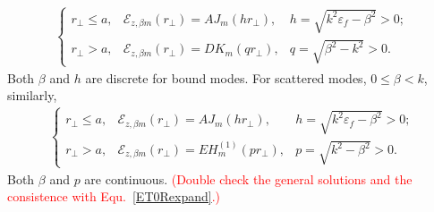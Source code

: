 \documentclass[]{report}
\begin{document}
\begin{align}
\left\{
 \begin{array}{lcll}
	r\!_\perp \leq a, & \mathcal{E}_{z,\beta m}(r\!_\perp )\!=\! AJ_m(h r\!_\perp), & h \!=\! 
	\sqrt{k^2\varepsilon_f-\beta^2}\! >\! 0;\\
	r\!_\perp > a, & \mathcal{E}_{z,\beta m}(r\!_\perp )\!=\!DK_m(q r\!_\perp), & q\!=\! 
	\sqrt{\beta^2-k^2}>0.
 \end{array}\right.
\end{align}
Both $ \beta $ and $ h $ are discrete for bound modes. 
For scattered modes, $ 0\leq \beta< k $, similarly, 
\begin{align}
\left\{
 \begin{array}{lcll}
	r\!_\perp \leq a, & \mathcal{E}_{z,\beta m}(r\!_\perp )\!=\! AJ_m(h r\!_\perp), & h \!=\! 
	\sqrt{k^2\varepsilon_f-\beta^2}\! >\! 0;\\
	r\!_\perp > a, & \mathcal{E}_{z,\beta m}(r\!_\perp )\!=\!EH_m^{(\!1\!)}(p r\!_\perp\!), & p\!\!=\!\! 
	\sqrt{k^2-\beta^2}>0.
 \end{array}\right.
\end{align}
Both $ \beta $ and $ p $ are continuous. \textcolor{red}{(Double check the general solutions and the consistence with Equ.~\ref{ET0Rexpand}.)}
\end{document}
